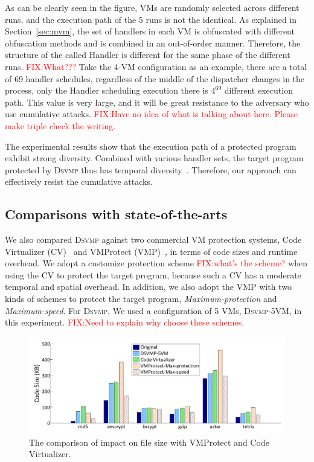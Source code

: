 \documentclass[preprint,12pt,3p]{elsarticle}
\newcommand{\DSVMP}{\textsc{Dsvmp}\xspace}
\newcommand\FIXME[1]{\textcolor{red}{FIX:}\textcolor{red}{#1}}
\begin{document}
As can be clearly seen in the figure, VMs are randomly selected across different runs,
and the execution path of the 5 runs is not the identical. As explained in Section~\ref{sec:mvm}, 
the set of handlers in each VM is obfuscated with different obfuscation methods and is combined in an out-of-order manner.
Therefore, the structure of the called Handler is different for the same phase of the different runs. \FIXME{What???}
Take the 4-VM configuration as an example, there are a total of 69 handler schedules, 
regardless of the middle of the dispatcher changes in the process,
only the Handler scheduling execution there is $4^{69}$ different execution path.
This value is very large, and it will be great resistance to the adversary who use cumulative attacks.
\FIXME{Have no idea of what is talking about here. Please make triple check the writing.}


The experimental results show that  the execution path of a protected program exhibit strong diversity. 
Combined with various handler sets, the target program protected by \DSVMP thus has temporal diversity~\cite{4collberg}.
Therefore, our approach can effectively resist the cumulative attacks.



\subsection{Comparisons with state-of-the-arts}\label{sec:comparetest}
We also compared \DSVMP against two commercial VM protection systems,
Code Virtualizer (CV)~\cite{2CV} and VMProtect (VMP)~\cite{3Vmprotect}, in terms of code sizes and runtime overhead.
We adopt a customize protection scheme \FIXME{what's the scheme?} when using the CV to protect the target program,
because such a CV has a moderate temporal and spatial overhead.
In addition, we also adopt the VMP with two kinds of schemes to protect the target program,
\emph{Maximum-protection} and \emph{Maximum-speed}.
For \DSVMP, We used a configuration of 5 VMs, \DSVMP-5VM, in this experiment.
\FIXME{Need to explain why choose these schemes.}


\begin{figure}[t]%
    \centering
    \includegraphics[width=0.9\columnwidth]{figure/comsize.pdf}
    \caption{The comparison of impact on file size with VMProtect and Code Virtualizer.}\label{fig:Fig.com-size}
\end{figure}
\end{document}
